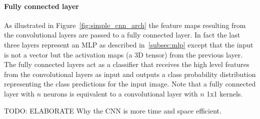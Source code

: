 \documentclass[12pt,a4paper]{article}
\begin{document}
\paragraph{Fully connected layer    } As illustrated in Figure~\ref{fig:simple_cnn_arch} the feature maps resulting from the convolutional layers are passed to a fully connected layer. In fact the last three layers represent an MLP as described in~\ref{subsec:mlp} except that the input is not a vector but the activation maps (a 3D tensor) from the previous layer. The fully connected layers act as a classifier that receives the high level features from the convolutional layers as input and outputs a class probability distribution representing the class predictions for the input image. Note that a fully connected layer with $n$ neurons is equivalent to a convolutional layer with $n$ 1x1 kernels.

TODO: ELABORATE Why the CNN is more time and space efficient.
\end{document}
